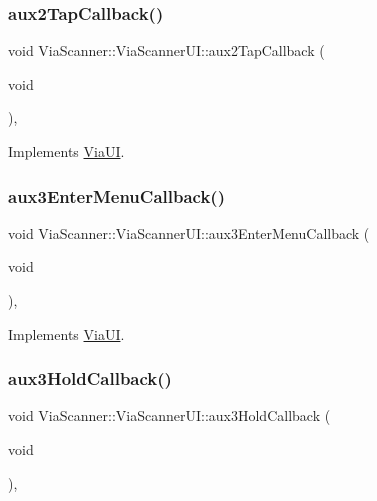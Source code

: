 \subsubsection{\texorpdfstring{aux2\+Tap\+Callback()}{aux2TapCallback()}}
{\footnotesize\ttfamily void Via\+Scanner\+::\+Via\+Scanner\+U\+I\+::aux2\+Tap\+Callback (\begin{DoxyParamCaption}\item[{void}]{ }\end{DoxyParamCaption})\hspace{0.3cm}{\ttfamily [override]}, {\ttfamily [virtual]}}



Implements \mbox{\hyperlink{class_via_u_i_ae5e009dc22002f62e6bff8dd76d2f745}{Via\+UI}}.

\mbox{\label{class_via_scanner_1_1_via_scanner_u_i_ade6dc0e93911fe51731bffa65990599a}} 
\subsubsection{\texorpdfstring{aux3\+Enter\+Menu\+Callback()}{aux3EnterMenuCallback()}}
{\footnotesize\ttfamily void Via\+Scanner\+::\+Via\+Scanner\+U\+I\+::aux3\+Enter\+Menu\+Callback (\begin{DoxyParamCaption}\item[{void}]{ }\end{DoxyParamCaption})\hspace{0.3cm}{\ttfamily [override]}, {\ttfamily [virtual]}}



Implements \mbox{\hyperlink{class_via_u_i_aa62c9f8dc58d37fc2a3abc7bce1cd16e}{Via\+UI}}.

\mbox{\label{class_via_scanner_1_1_via_scanner_u_i_ac79b09eb94d39065b6b5061d34746862}} 
\subsubsection{\texorpdfstring{aux3\+Hold\+Callback()}{aux3HoldCallback()}}
{\footnotesize\ttfamily void Via\+Scanner\+::\+Via\+Scanner\+U\+I\+::aux3\+Hold\+Callback (\begin{DoxyParamCaption}\item[{void}]{ }\end{DoxyParamCaption})\hspace{0.3cm}{\ttfamily [override]}, {\ttfamily [virtual]}}



